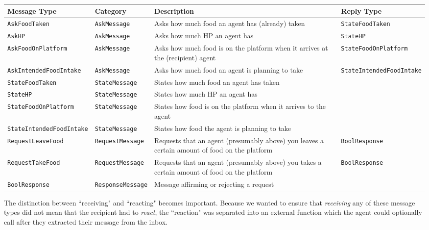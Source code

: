 \begin{center}
\begin{longtable}{p{4cm}p{2.5cm}p{4cm}p{4cm}}
 \hline
 \textbf{Message Type} & \textbf{Category} & \textbf{Description} & \textbf{Reply Type} \\ [0.5ex] 
 \hline\hline
 \texttt{AskFoodTaken} & \texttt{AskMessage} & Asks how much food an agent has (already) taken
 & \texttt{StateFoodTaken} \\ 
 \hline
 \texttt{AskHP} & \texttt{AskMessage} & Asks how much HP an agent has & \texttt{StateHP} \\ 
  \hline
 \texttt{AskFoodOnPlatform} & \texttt{AskMessage} & Asks how much food is on the platform when it arrives at the (recipient) agent & \texttt{StateFoodOnPlatform} \\ 
 \hline
 \texttt{AskIntendedFoodIntake} & \texttt{AskMessage} & Asks how much food an agent is planning to take & \texttt{StateIntendedFoodIntake} \\ 
 \hline
 \texttt{StateFoodTaken} & \texttt{StateMessage} & States how much food an agent has taken &   \\
 \hline
 \texttt{StateHP} & \texttt{StateMessage} & States how much HP an agent has &   \\
 \hline
 \texttt{StateFoodOnPlatform} & \texttt{StateMessage} & States how food is on the platform when it arrives to the agent &  
 \\
 \hline
 \texttt{StateIntendedFoodIntake} & \texttt{StateMessage} & States how food the agent is planning to take &  
 \\
 \hline
 \texttt{RequestLeaveFood} & \texttt{RequestMessage} & Requests that an agent (presumably above) you leaves a certain amount of food on the platform & \texttt{BoolResponse}
 \\
 \hline
 \texttt{RequestTakeFood} & \texttt{RequestMessage} & Requests that an agent (presumably above) you takes a certain amount of food on the platform & \texttt{BoolResponse}
 \\
 \hline
 \texttt{BoolResponse} & \texttt{ResponseMessage} & Message affirming or rejecting a request &  
\end{longtable}
\end{center}
The distinction between ``receiving" and ``reacting" becomes important. Because we wanted to ensure that \textit{receiving} any of these message types did not mean that the recipient had to \textit{react}, the ``reaction" was separated into an external function which the agent could optionally call after they extracted their message from the inbox. \newline
